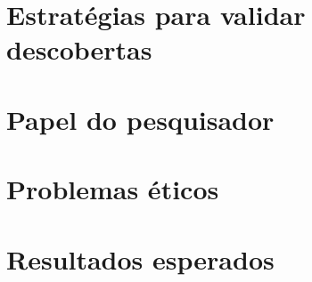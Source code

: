

\section{Estratégias para validar descobertas}
\label{sec:planejamento-validacao}

\section{Papel do pesquisador}
\label{sec:planejamento-papel}

\section{Problemas éticos}
\label{sec:planejamento-etica}

\section{Resultados esperados}
\label{sec:planejamento-resultados-esperados}
